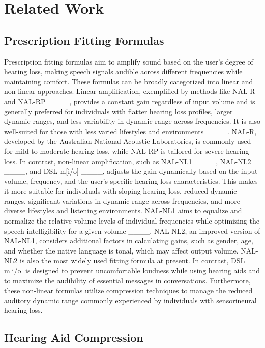 \section{Related Work}
\label{sec:related}

\subsection{Prescription Fitting Formulas}
Prescription fitting formulas aim to amplify sound based on the user's degree of hearing loss, making speech signals audible across different frequencies while maintaining comfort. These formulas can be broadly categorized into linear and non-linear approaches. Linear amplification, exemplified by methods like NAL-R and NAL-RP ____, provides a constant gain regardless of input volume and is generally preferred for individuals with flatter hearing loss profiles, larger dynamic ranges, and less variability in dynamic range across frequencies. It is also well-suited for those with less varied lifestyles and environments ____. NAL-R, developed by the Australian National Acoustic Laboratories, is commonly used for mild to moderate hearing loss, while NAL-RP is tailored for severe hearing loss. In contrast, non-linear amplification, such as NAL-NL1 ____, NAL-NL2 ____, and DSL m[i/o] ____, adjusts the gain dynamically based on the input volume, frequency, and the user's specific hearing loss characteristics. This makes it more suitable for individuals with sloping hearing loss, reduced dynamic ranges, significant variations in dynamic range across frequencies, and more diverse lifestyles and listening environments. NAL-NL1 aims to equalize and normalize the relative volume levels of individual frequencies while optimizing the speech intelligibility for a given volume ____. NAL-NL2, an improved version of NAL-NL1, considers additional factors in calculating gains, such as gender, age, and whether the native language is tonal, which may affect output volume. NAL-NL2 is also the most widely used fitting formula at present. In contrast, DSL m[i/o] is designed to prevent uncomfortable loudness while using hearing aids and to maximize the audibility of essential messages in conversations. Furthermore, these non-linear formulas utilize compression techniques to manage the reduced auditory dynamic range commonly experienced by individuals with sensorineural hearing loss.

\subsection{Hearing Aid Compression}

